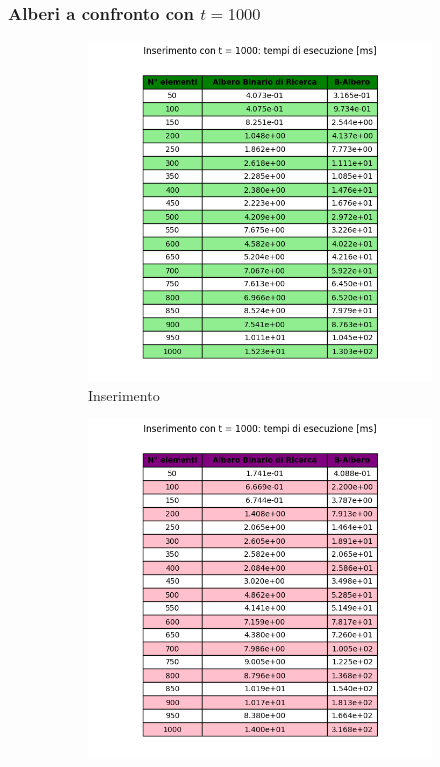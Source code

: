 \subsubsection{Alberi a confronto con $t = 1000$}

\begin{figure}[H]
    \centering
    \begin{subfigure}[b]{0.49\textwidth}
        \centering
        \includegraphics[width=\textwidth]{tables/insert-ms-t1000.png}
        \caption{Inserimento}
        \label{fig:tableinserttimet1000}
    \end{subfigure}
    \hfill
    \begin{subfigure}[b]{0.49\textwidth}
        \centering
        \includegraphics[width=\textwidth]{tables/search-ms-t1000.png}

\end{subfigure}
\end{figure}
